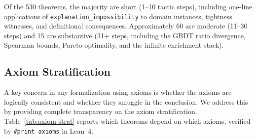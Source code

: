 \documentclass[11pt,a4paper]{article}
\begin{document}
Of the 530 theorems, the majority are short (1--10 tactic steps), including one-line applications of \texttt{explanation\_impossibility} to domain instances, tightness witnesses, and definitional consequences. Approximately 60 are moderate (11--30 steps) and 15 are substantive (31+ steps, including the GBDT ratio divergence, Spearman bounds, Pareto-optimality, and the infinite enrichment stack).

\subsection{Axiom Stratification}
\label{sec:axiom-stratification}

A key concern in any formalization using axioms is whether the axioms are
logically consistent and whether they smuggle in the conclusion.  We address
this by providing complete transparency on the axiom stratification.
Table~\ref{tab:axiom-strat} reports which theorems depend on which axioms,
verified by \texttt{\#print axioms} in Lean~4.
\end{document}
